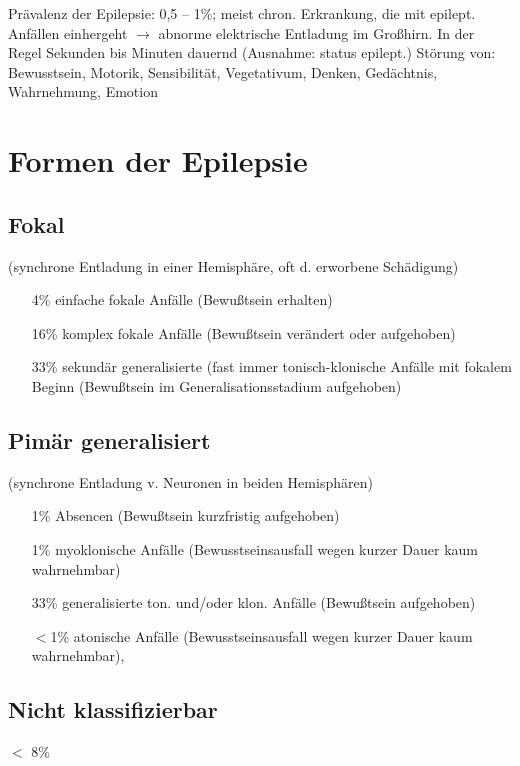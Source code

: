 \documentclass[10pt,a4paper]{report}
\begin{document}
Prävalenz der Epilepsie: 0,5 – 1\%; meist chron. Erkrankung, die mit epilept. Anfällen einhergeht $\rightarrow$ abnorme elektrische Entladung im Großhirn. In der Regel Sekunden bis Minuten dauernd (Ausnahme: status epilept.)
Störung von:  Bewusstsein,  Motorik, Sensibilität, Vegetativum, Denken, Gedächtnis, Wahrnehmung, Emotion
\section{Formen der Epilepsie} %
\label{sec:formen_der_epilepsie}
\subsection{Fokal} %
\label{sub:fokal}
(synchrone Entladung in einer Hemisphäre, oft d. erworbene Schädigung)
\begin{itemize}
	\item[4\%] einfache fokale Anfälle  (Bewußtsein erhalten)
	\item[16\%] komplex fokale Anfälle (Bewußtsein verändert oder aufgehoben)
	\item[33\%]sekundär generalisierte (fast immer tonisch-klonische Anfälle mit fokalem Beginn (Bewußtsein im Generalisationsstadium aufgehoben)
\end{itemize}
\subsection{Pimär generalisiert} %
\label{sub:pim_r_generalisiert}
(synchrone Entladung v. Neuronen in beiden Hemisphären)
\begin{itemize}
	\item[1\%] Absencen (Bewußtsein kurzfristig aufgehoben)
	\item[1\%] myoklonische Anfälle (Bewusstseinsausfall wegen kurzer Dauer kaum wahrnehmbar)
	\item[33\%] generalisierte ton. und/oder klon. Anfälle (Bewußtsein aufgehoben)
	\item[$<$1\%] atonische Anfälle (Bewusstseinsausfall wegen kurzer Dauer kaum wahrnehmbar), 
\end{itemize}
\subsection{Nicht klassifizierbar} %
\label{sub:nicht_klassifizierbar}
$<$ 8\%
\end{document}
